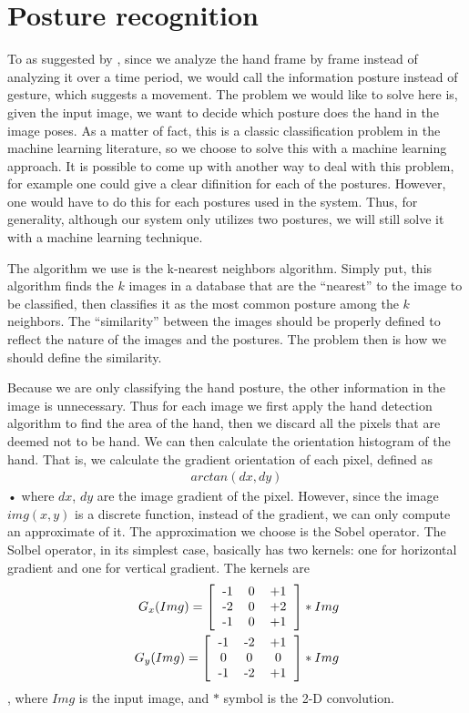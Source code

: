 \section{Posture recognition}
To as suggested by \cite{orientation}, since we analyze the hand frame by frame instead of analyzing it over a time period, we would call the information  posture instead of gesture, which suggests a movement. The problem we would like to solve here is, given the input image, we want to decide which posture does the hand in the image poses. As a matter of fact, this is a classic classification problem in the machine learning literature, so we choose to solve this with a machine learning approach. It is possible to come up with another way to deal with this problem, for example one could give a clear difinition for each of the postures. However, one would have to do this for each postures used in the system. Thus, for generality, although our system only utilizes two postures, we will still solve it with a machine learning technique. 

The algorithm we use is the k-nearest neighbors algorithm. Simply put, this algorithm finds the $k$ images in a database that are the ``nearest'' to the image to be classified, then classifies it as the most common posture among the $k$ neighbors. The ``similarity'' between the images should be properly defined to reflect the nature of the images and the postures. The problem then is how we should define the similarity. 

Because we are only classifying the hand posture, the other information in the image is unnecessary. Thus for each image we first apply the hand detection algorithm to find the area of the hand, then we discard all the pixels that are deemed not to be hand. We can then calculate the orientation histogram of the hand. That is, we calculate the gradient orientation of each pixel, defined as
\begin{align}
arctan(dx, dy)
\end{align}•
where $dx$, $dy$ are the image gradient of the pixel. However, since the image $img(x,y)$ is a discrete function, instead of the gradient, we can only compute an approximate of it. The approximation we choose is the Sobel operator. The Solbel operator, in its simplest case, basically has two kernels: one for horizontal gradient and one for vertical gradient. The kernels are 
\begin{align*}
 G_x(Img) = 
 \left[
  \begin{tabular}{c c c}
   -1&0&+1\\
   -2&0&+2\\
   -1&0&+1\\
  \end{tabular}
 \right]
*Img\\
G_y(Img) =
\left[
\begin{tabular}{c c c}
-1&-2&+1\\
0&0&0\\
-1&-2&+1\\
\end{tabular}
\right]
*Img\\
\end{align*}
, where $Img$ is the input image, and $*$ symbol is the 2-D convolution. 

